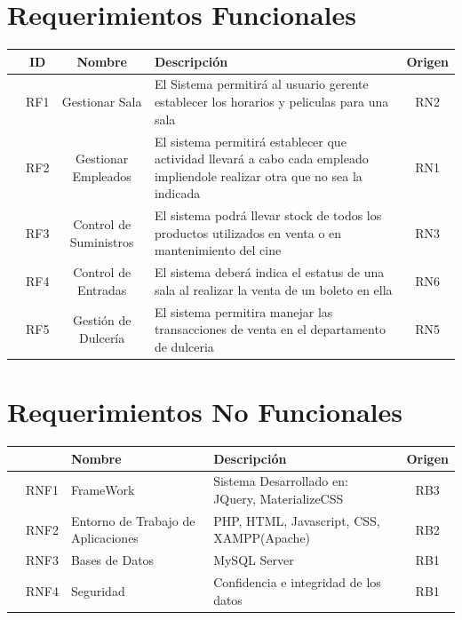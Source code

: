 \documentclass[11pt, fleqn]{article}                             %
\begin{document}
\section{Requerimientos Funcionales}
\begin{tabular}{r ||c |c | m{15em} |c }
   &  ID & Nombre & Descripción & Origen \\ [0.5ex] 
   \hline\hline
  
    & RF1 & Gestionar Sala          &
    El Sistema permitirá al usuario gerente establecer los horarios y peliculas para una sala
    & RN2\\
    & RF2 & Gestionar Empleados     & 
    El sistema permitirá establecer que actividad llevará a cabo cada empleado impliendole
    realizar otra que no sea la indicada
    & RN1\\
    & RF3 & Control de Suministros  &
    El sistema podrá llevar stock de todos los productos utilizados en venta o en mantenimiento del cine
    & RN3\\
    & RF4 & Control de Entradas     &
    El sistema deberá indica el estatus de una sala al realizar la venta de un boleto en ella
    & RN6\\
    & RF5 & Gestión de Dulcería     & 
    El sistema permitira manejar las transacciones de venta en el departamento de dulceria
    & RN5\\
\end{tabular}



\section{Requerimientos No Funcionales}
    \begin{tabular}{r ||c |m{8em} | m{18em} |c }
       &   & Nombre & Descripción & Origen \\ [0.5ex] 
       \hline\hline
        & RNF1 & FrameWork &
        Sistema Desarrollado en: JQuery, MaterializeCSS
        & RB3\\

        & RNF2 & Entorno de Trabajo de Aplicaciones &
        PHP, HTML, Javascript, CSS, XAMPP(Apache)  
        & RB2\\

        & RNF3 & Bases de Datos & MySQL Server
        & RB1\\

        & RNF4 & Seguridad & Confidencia e integridad de los datos
        & RB1\\
    \end{tabular}
\end{document}
